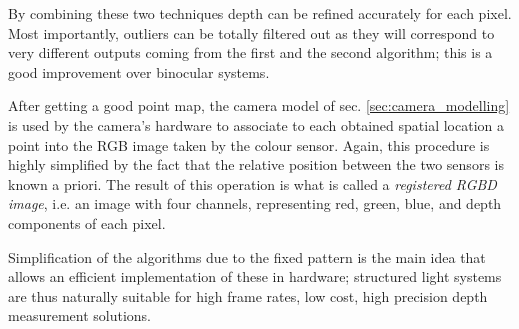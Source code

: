 By combining these two techniques depth can be refined accurately for each
pixel. Most importantly, outliers can be totally filtered out as they will
correspond to very different outputs coming from the first and the second
algorithm; this is a good improvement over binocular systems.

After getting a good point map, the camera model of sec.
\ref{sec:camera_modelling} is used by the camera's hardware to associate to each
obtained spatial location a point into the RGB image taken by the colour sensor.
Again, this procedure is highly simplified by the fact that the relative
position between the two sensors is known a priori. The result of this operation
is what is called a \emph{registered RGBD image}, i.e. an image with four
channels, representing red, green, blue, and depth components of each pixel.

Simplification of the algorithms due to the fixed pattern is the main idea that
allows an efficient implementation of these in hardware; structured light systems are thus
naturally suitable for high frame rates, low cost, high precision depth
measurement solutions.
